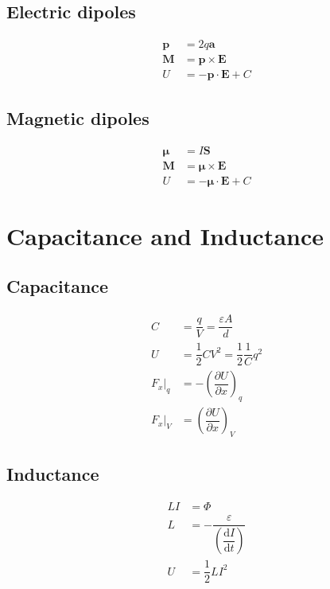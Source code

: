 \documentclass[10pt, a4paper]{article}
\def\D{\partial}
\def\d{\mathrm{d}}
\def\epsilon{\varepsilon}
\def\Phi{\varPhi}
\begin{document}
\begin{multicols}{2}

\subsection{Electric dipoles}

\begin{align}
	\bm{p} &= 2q\bm{a}\\
	\bm{M} &= \bm{p} \times \bm{E}\\
	U &= - \bm{p} \cdot \bm{E} + C
\end{align}

\subsection{Magnetic dipoles}

\begin{align}
	\bm{\mu} &= I\bm{S}\\ 
	\bm{M} &= \bm{\mu} \times \bm{E}\\
	U &= - \bm{\mu} \cdot \bm{E} + C
\end{align}

\end{multicols}

\section{Capacitance and Inductance}

\begin{multicols}{2}

\subsection{Capacitance}

	\begin{align}
		C &= \dfrac{q}{V} = \dfrac{\epsilon A}{d}\\
		U &= \dfrac{1}{2}CV^2 = \dfrac{1}{2}\dfrac{1}{C}q^2\\
		\left.F_x\right|_q &= -\left(\dfrac{\D U}{\D x}\right)_q\\
		\left.F_x\right|_V &= \left(\dfrac{\D U}{\D x}\right)_V
	\end{align}
	
\subsection{Inductance}
	
	\begin{align}
		LI &= \Phi\\
		L &= -\dfrac{\epsilon}{\left(\dfrac{\d I}{\d t}\right)}\\
		U &= \dfrac{1}{2}LI^2
	\end{align}
	
\end{multicols}
\end{document}
